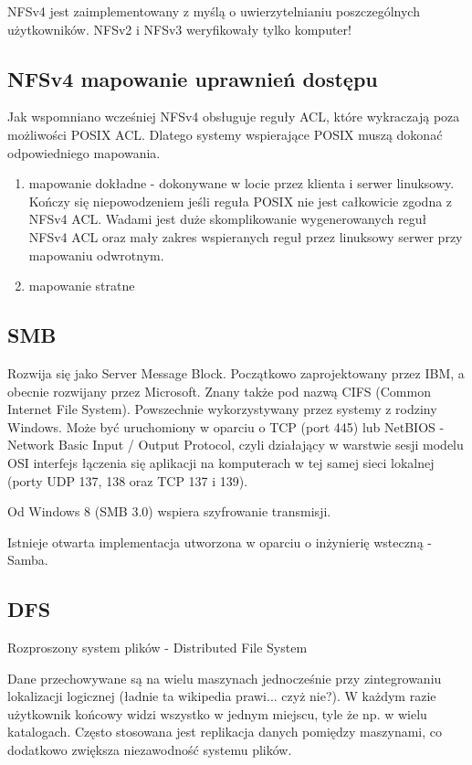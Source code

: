 NFSv4 jest zaimplementowany z myślą o uwierzytelnianiu poszczególnych użytkowników. NFSv2 i NFSv3 weryfikowały tylko komputer!

\subsection{NFSv4 mapowanie uprawnień dostępu}
Jak wspomniano wcześniej NFSv4 obsługuje reguły ACL, które wykraczają poza możliwości POSIX ACL. Dlatego systemy wspierające POSIX muszą dokonać odpowiedniego mapowania.

\begin{enumerate}
	\item mapowanie dokładne - dokonywane w locie przez klienta i serwer linuksowy. Kończy się niepowodzeniem jeśli reguła POSIX nie jest całkowicie zgodna z NFSv4 ACL. Wadami jest duże skomplikowanie wygenerowanych reguł NFSv4 ACL oraz mały zakres wspieranych reguł przez linuksowy serwer przy mapowaniu odwrotnym.
	\item mapowanie stratne
\end{enumerate}

\subsection{SMB}
Rozwija się jako Server Message Block. Początkowo zaprojektowany przez IBM, a obecnie rozwijany przez Microsoft. Znany także pod nazwą CIFS (Common Internet File System). Powszechnie wykorzystywany przez systemy z rodziny Windows. Może być uruchomiony w oparciu o TCP (port 445) lub NetBIOS - Network Basic Input / Output Protocol, czyli działający w warstwie sesji modelu OSI interfejs łączenia się aplikacji na komputerach w tej samej sieci lokalnej (porty UDP 137, 138  oraz TCP 137 i 139).

Od Windows 8 (SMB 3.0) wspiera szyfrowanie transmisji.

Istnieje otwarta implementacja utworzona w oparciu o inżynierię wsteczną - Samba.

\subsection{DFS}
Rozproszony system plików - Distributed File System

Dane przechowywane są na wielu maszynach jednocześnie przy zintegrowaniu lokalizacji logicznej (ładnie ta wikipedia prawi... czyż nie?). W każdym razie użytkownik końcowy widzi wszystko w jednym miejscu, tyle że np. w wielu katalogach. Często stosowana jest replikacja danych pomiędzy maszynami, co dodatkowo zwiększa niezawodność systemu plików.

